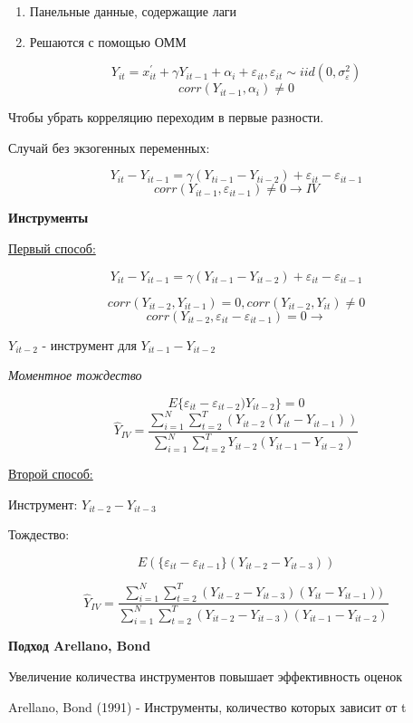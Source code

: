 \documentclass[a4paper, 12pt]{article}
\begin{document}
\begin{enumerate}
    \item Панельные данные, содержащие лаги
    \item Решаются с помощью ОММ
\end{enumerate}

\[Y_{it} = x_{it}^{\prime} + \gamma Y_{it - 1} + \alpha_i + \varepsilon_{it}, 
\varepsilon_{it} \sim iid(0, \sigma_{\varepsilon}^2)\]
\[corr(Y_{it - 1}, \alpha_i) \neq 0\]

Чтобы убрать корреляцию переходим в первые разности.

Случай без экзогенных переменных:

\[Y_{it} - Y_{it - 1} = \gamma(Y_{ti - 1} - Y_{ti - 2}) + \varepsilon_{it} - \varepsilon_{it - 1}\]
\[corr(Y_{it - 1}, \varepsilon_{it - 1}) \neq 0 \rightarrow IV\]

\textbf{Инструменты}

\underline{Первый способ:}

\[Y_{it} - Y_{it - 1} = \gamma(Y_{it - 1} - Y_{it - 2}) + \varepsilon_{it} - \varepsilon_{it - 1}\]

\[corr(Y_{it - 2}, Y_{it - 1}) = 0, corr(Y_{it - 2}, Y_{it}) \neq 0\]
\[corr(Y_{it - 2}, \varepsilon_{it} - \varepsilon_{it - 1}) = 0 \rightarrow\]

$Y_{it - 2}$ - инструмент для $Y_{it - 1} - Y_{it - 2}$

\textit{Моментное тождество}

\[E\{\varepsilon_{it} - \varepsilon_{it - 2})Y_{it - 2}\} = 0\]
\[\hat{Y}_{IV} = \frac{\sum_{i = 1}^N \sum_{t = 2}^T(Y_{it - 2}(Y_{it} - Y_{it - 1}))}
{\sum_{i = 1}^N \sum_{t = 2}^T Y_{it - 2}(Y_{it - 1} - Y_{it - 2})}\]

\underline{Второй способ:}

Инструмент: $Y_{it - 2} - Y_{it - 3}$

Тождество:

\[E(\{\varepsilon_{it} - \varepsilon_{it - 1}\}(Y_{it - 2} - Y_{it - 3}))\]

\[\hat{Y}_{IV} = \frac{\sum_{i = 1}^N \sum_{t = 2}^T(Y_{it - 2} - Y_{it - 3})(Y_{it} - Y_{it - 1}))}
{\sum_{i = 1}^N \sum_{t = 2}^T (Y_{it - 2} - Y_{it - 3})(Y_{it - 1} - Y_{it - 2})} \]


\textbf{Подход Arellano, Bond}

Увеличение количества инструментов повышает эффективность оценок

Arellano, Bond (1991) - Инструменты, количество которых зависит от t
\end{document}
